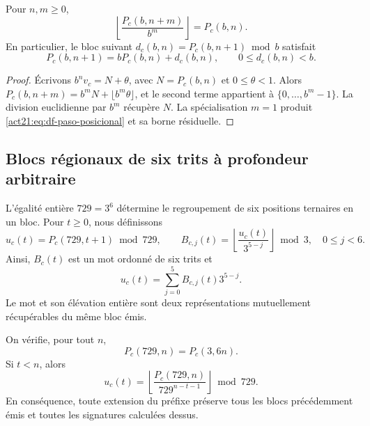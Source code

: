 \begin{proposition}
\label{act21:prop:df-prefijos-compatibles}
Pour \(n,m\geq0\),
\begin{equation}
 \left\lfloor\frac{P_c(b,n+m)}{b^m}\right\rfloor=P_c(b,n).
 \label{act21:eq:df-truncamiento}
\end{equation}
En particulier, le bloc suivant
\(d_c(b,n)=P_c(b,n+1)\bmod b\) satisfait
\begin{equation}
 P_c(b,n+1)=bP_c(b,n)+d_c(b,n),\qquad 0\leq d_c(b,n)<b.
 \label{act21:eq:df-paso-posicional}
\end{equation}
\end{proposition}

\begin{proof}
Écrivons \(b^n v_c=N+\theta\), avec
\(N=P_c(b,n)\) et \(0\leq\theta<1\). Alors
\(P_c(b,n+m)=b^mN+\lfloor b^m\theta\rfloor\), et le second terme
appartient à \(\{0,\ldots,b^m-1\}\). La division euclidienne par \(b^m\)
récupère \(N\). La spécialisation \(m=1\) produit
\eqref{act21:eq:df-paso-posicional} et sa borne résiduelle.
\end{proof}

\subsection{Blocs régionaux de six trits à profondeur arbitraire}
\label{act21:subsec:df-bloques-arbitrarios}


L'égalité entière \(729=3^6\) détermine le regroupement de six positions ternaires en un bloc. Pour \(t\geq0\), nous définissons
\begin{equation}
 u_c(t)=P_c(729,t+1)\bmod729,
 \qquad
 B_{c,j}(t)=
 \left\lfloor\frac{u_c(t)}{3^{5-j}}\right\rfloor\bmod3,
 \quad 0\leq j<6.
 \label{act21:eq:df-bloque-y-banda}
\end{equation}
Ainsi, \(B_c(t)\) est un mot ordonné de six trits et
\begin{equation}
 u_c(t)=\sum_{j=0}^{5}B_{c,j}(t)3^{5-j}.
 \label{act21:eq:df-elevacion-banda}
\end{equation}
Le mot et son élévation entière sont deux représentations mutuellement récupérables du même bloc émis.

\begin{theorem}
\label{act21:thm:df-bloque-estable}
On vérifie, pour tout \(n\),
\[
 P_c(729,n)=P_c(3,6n).
\]
Si \(t<n\), alors
\begin{equation}
 u_c(t)=
 \left\lfloor\frac{P_c(729,n)}{729^{n-t-1}}\right\rfloor\bmod729.
 \label{act21:eq:df-bloque-prefijo-largo}
\end{equation}
En conséquence, toute extension du préfixe préserve tous les
blocs précédemment émis et toutes les signatures calculées dessus.
\end{theorem}

